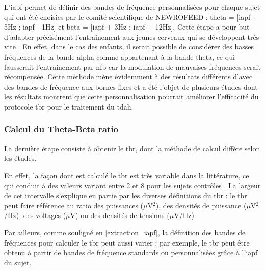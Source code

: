 L'\gls{iapf} permet de définir des bandes de fréquence personnalisées pour chaque sujet qui ont été choisies 
par le comité scientifique de NEWROFEED : theta = [\gls{iapf} - 5Hz ; \gls{iapf} - 1Hz] et beta = [\gls{iapf} + 3Hz ; \gls{iapf} + 12Hz].
Cette étape a pour but d'adapter précisément l'entrainement aux jeunes cerveaux qui se développent très vite \citep{Aurlien2004}. En effet, dans le cas des enfants, il serait possible de considérer 
des basses fréquences de la bande alpha comme appartenant à la bande theta, ce qui fausserait l'entrainement par \gls{nfb} car la modulation de mauvaises fréquences 
serait récompensée. Cette méthode mène évidemment à des résultats différents d'avec des bandes de fréquence aux bornes fixes \citep{Arns2008, Vollebregt2015} et a été 
l'objet de plusieurs études \citep{Kaiser2001, Bazanova2006, Vollebregt2015} dont les résultats montrent que cette personnalisation pourrait améliorer l'efficacité du protocole
\gls{tbr} pour le traitement du \gls{tdah}.

\subsubsection{Calcul du Theta-Beta ratio} \label{tbr_computation}
La dernière étape consiste à obtenir le \gls{tbr}, dont la méthode de calcul diffère selon les études.

En effet, la façon dont est calculé le \gls{tbr} est très variable dans la littérature, ce qui conduit à des valeurs variant entre 2 et 8 pour les sujets contrôles \citep{Arns2012,
Schutte2017}. La largeur de cet intervalle s'explique en partie par les diverses définitions du \gls{tbr} : le \gls{tbr} peut faire référence au ratio
des puissances ($\mu$V$^2$), des densités de puissance ($\mu$V$^2$/Hz), des voltages ($\mu$V) ou des densités de tensions ($\mu$V/Hz).  

Par ailleurs, comme souligné en \ref{extraction_iapf}, la définition des bandes de fréquences pour calculer le \gls{tbr} peut aussi varier : par exemple, le \gls{tbr} peut être obtenu à partir
de bandes de fréquence standards ou personnalisées grâce à l'\gls{iapf} du sujet. 

